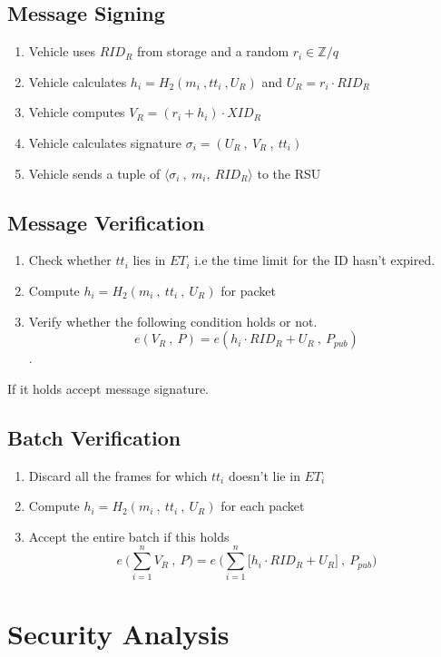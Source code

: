 \documentclass[10pt,journal,letterpaper]{IEEEtran}
\begin{document}
\subsection{Message Signing}
\begin{enumerate}
    \item Vehicle uses $RID_R$ from storage and a random $r_i \in \mathbb{Z}/q$
    \item Vehicle calculates $h_i = H_2(m_i\:,tt_i \: , U_R)$ and $U_R = r_i \cdot RID_R$
    \item Vehicle computes $V_R = (r_i+h_i) \cdot XID_R$
    \item Vehicle calculates signature $\sigma_i = (U_R\:,\:V_R\:,\:tt_i)$
    \item Vehicle sends a tuple of  $\langle\sigma_i \: , \: m_i , \: RID_R\rangle$ to the RSU
\end{enumerate}

\subsection{Message Verification}
\begin{enumerate}
    \item Check whether $tt_i$ lies in $ET_i$ i.e the time limit for the ID hasn't expired.
     \item Compute $h_i = H_2(m_i\:,\:tt_i\:,\:U_R)$ for packet
    \item Verify whether the following condition holds or not. $$e(V_R\:,\:P) = e(h_i\cdot RID_R + U_R\:,\:P_{pub}) $$.
\end{enumerate}
If it holds accept message signature.

\subsection{Batch Verification}
\begin{enumerate}
    \item Discard all the frames for which $tt_i$ doesn't lie in $ET_i$
    \item Compute $h_i = H_2(m_i\:,\:tt_i\:,\:U_R)$ for each packet
    \item Accept the entire batch if this holds \\
    $$e\:\Bigg( \sum_{i=1}^{n}V_R\:,\:P \Bigg) = e\:\Bigg(\sum_{i=1}^{n} \big[ h_i\cdot RID_R + U_R \big]\:,\:P_{pub} \Bigg) $$
\end{enumerate}


\section{Security Analysis}
\end{document}
